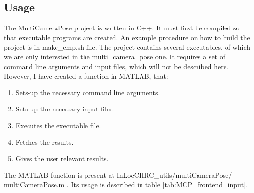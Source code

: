\documentclass[twoside]{ctuthesis}
\theoremstyle{plain}
\theoremstyle{definition}
\theoremstyle{note}
\newcommand{\code}[1]{{\ttfamily #1%
}}
\begin{document}
\subsection{Usage}
The \code{MultiCameraPose} project is written in C++. It must first be compiled so that executable programs are created. An example procedure on how to build the project is in \code{make\_cmp.sh} file. The project contains several executables, of which we are only interested in the \code{multi\_camera\_pose} one. It requires a set of command line arguments and input files, which will not be described here. However, I have created a function in MATLAB, that:

\begin{enumerate}
	\item Sets-up the necessary command line arguments.
	\item Sets-up the necessary input files.
	\item Executes the executable file.
	\item Fetches the results.
	\item Gives the user relevant results.
\end{enumerate}

The MATLAB function is present at \code{InLocCIIRC\_utils/multiCameraPose/ \allowbreak multiCameraPose.m}. Its usage is described in table \ref{tab:MCP_frontend_input}.
\end{document}
